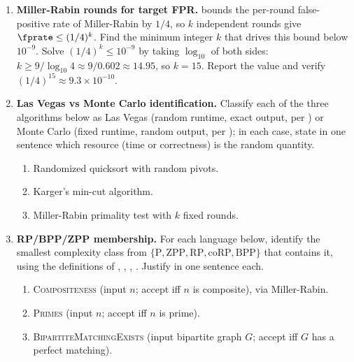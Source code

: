 \begin{enumerate}


\item \exstar
\label{ex:ch11-1}
\textbf{Miller-Rabin rounds for target FPR.}
 bounds the per-round false-positive
rate of Miller-Rabin by $1/4$, so $k$ independent rounds give
$\fprate \le (1/4)^k$. Find the minimum integer $k$ that drives
this bound below $10^{-9}$. Solve $(1/4)^k \le 10^{-9}$ by taking
$\log_{10}$ of both sides: $k \ge 9 / \log_{10} 4 \approx 9 /
0.602 \approx 14.95$, so $k = 15$. Report the value and verify
$(1/4)^{15} \approx 9.3 \times 10^{-10}$.

\item \exstar
\label{ex:ch11-2}
\textbf{Las Vegas vs Monte Carlo identification.}
Classify each of the three algorithms below as Las Vegas (random
runtime, exact output, per ) or Monte Carlo
(fixed runtime, random output, per ); in
each case, state in one sentence which resource (time or
correctness) is the random quantity.
\begin{enumerate}
  \item[(a)] Randomized quicksort with random pivots.
  \item[(b)] Karger's min-cut algorithm.
  \item[(c)] Miller-Rabin primality test with $k$ fixed rounds.
\end{enumerate}

\item \exstar
\label{ex:ch11-3}
\textbf{RP/BPP/ZPP membership.}
For each language below, identify the smallest complexity class
from $\{\mathrm{P}, \mathrm{ZPP}, \mathrm{RP}, \mathrm{coRP},
\mathrm{BPP}\}$ that contains it, using the definitions of
, , , .
Justify in one sentence each.
\begin{enumerate}
  \item[(a)] \textsc{Compositeness} (input $n$; accept iff $n$ is
    composite), via Miller-Rabin.
  \item[(b)] \textsc{Primes} (input $n$; accept iff $n$ is prime).
  \item[(c)] \textsc{BipartiteMatchingExists} (input bipartite
    graph $G$; accept iff $G$ has a perfect matching).
\end{enumerate}


\end{enumerate}
